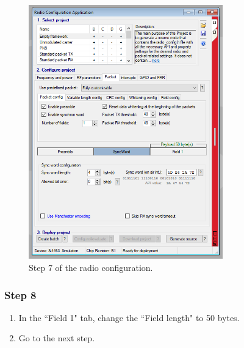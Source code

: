 \begin{figure}[!h]
	\begin{center}
		\includegraphics[width=0.75\textwidth]{figures/wds-tutorial-7.png}
		\caption{Step 7 of the radio configuration.}
		\label{fig:wds-tutorial-step-7}
	\end{center}
\end{figure}

\subsubsection{Step 8}

\begin{enumerate}
    \item In the ``Field 1" tab, change the ``Field length" to 50 bytes.
    \item Go to the next step.
\end{enumerate}

